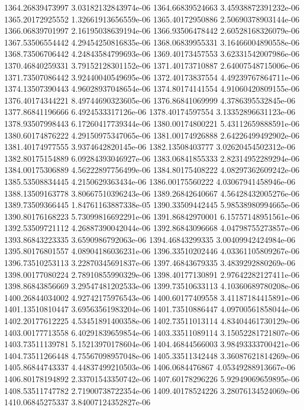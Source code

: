 {1364.26839473997 3.03182132843974e-06
1364.66839524663 3.45938872391232e-06
1365.20172925552 1.32661913656559e-06
1365.40172950886 2.50690378903144e-06
1366.06839701997 2.16195038639194e-06
1366.93506478442 2.60528168326079e-06
1367.53506554442 4.29454250816835e-06
1368.06839955331 3.16466004890558e-06
1368.73506706442 4.24843584799693e-06
1369.40173457553 3.62331542007986e-06
1370.46840259331 3.79152128301152e-06
1371.40173710887 2.64007548715006e-06
1371.73507086442 3.92440040549695e-06
1372.40173837554 4.49239767864711e-06
1374.13507390443 4.96028937048654e-06
1374.80174141554 4.91060420809155e-06
1376.40174344221 8.49744690323605e-06
1376.86841069999 4.3786395532845e-06
1377.86841196666 6.4924533317126e-06
1378.40174597554 3.13352896631123e-06
1378.93507998443 6.17260417739344e-06
1380.00174800221 5.43112659888591e-06
1380.60174876222 4.29150975347065e-06
1381.00174926888 2.64226499492902e-06
1381.40174977555 3.9374642820145e-06
1382.13508403777 3.02620454502312e-06
1382.80175154889 6.09284393046927e-06
1383.06841855333 2.82314952289294e-06
1384.00175306889 4.56222897756499e-06
1384.80175408222 4.08297362609242e-06
1385.53508834445 4.2150629363434e-06
1386.00175560222 4.03067941458946e-06
1388.13509163778 3.80667510396243e-06
1389.26842640667 4.56428432005276e-06
1389.73509366445 1.84761163887338e-05
1390.33509442445 5.98538980994665e-06
1390.80176168223 5.73099816692291e-06
1391.86842970001 6.15757148951561e-06
1392.53509721112 4.26887390042044e-06
1392.86843096668 4.04798755273857e-06
1393.86843223335 3.6590986792063e-06
1394.46843299335 3.00409942424984e-06
1395.80176801557 4.08904186036231e-06
1396.33510202446 4.03361105809267e-06
1396.73510253113 3.22870345691837e-06
1397.46843679335 3.4839292880269e-06
1398.00177080224 2.78910855990329e-06
1398.40177130891 2.97642282127411e-06
1398.86843856669 3.29547481202533e-06
1399.73510633113 4.10360689780208e-06
1400.26844034002 4.92742175976543e-06
1400.60177409558 3.41187184415891e-06
1401.13510810447 3.69563561983204e-06
1401.73510886447 4.09700561858044e-06
1402.20177612225 4.53451891400358e-06
1402.73511013114 4.83404461730129e-06
1403.00177713558 6.40291839659854e-06
1403.33511089114 3.15052281721807e-06
1403.73511139781 5.15213970178604e-06
1404.46844566003 3.98493333700421e-06
1404.73511266448 4.75567098957048e-06
1405.33511342448 3.36087621814269e-06
1405.86844743337 4.44837499210503e-06
1406.0684476867 4.05349288913667e-06
1406.80178194892 2.33701543350742e-06
1407.60178296226 5.92949069659895e-06
1408.53511747782 2.71900738722354e-06
1409.40178524226 3.28076134524069e-06
1410.06845275337 3.84007124352827e-06
}
